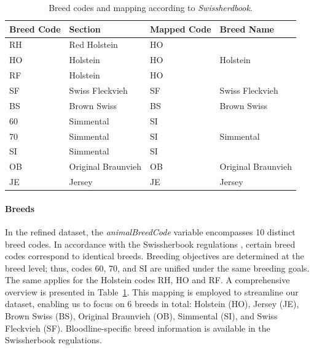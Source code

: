 \begin{table}[H]
\centering
\begin{tabular}{l l l l }
\textbf{Breed Code} & \textbf{Section} & \textbf{Mapped Code} & \textbf{Breed Name} \\
\hline
\hline
\cellcolor[HTML]{CDCDE7} RH & \cellcolor[HTML]{CDCDE7}Red Holstein & \cellcolor[HTML]{CDCDE7}HO & \cellcolor[HTML]{CDCDE7}\\
\cellcolor[HTML]{CDCDE7} HO & \cellcolor[HTML]{CDCDE7}Holstein & \cellcolor[HTML]{CDCDE7}HO & \cellcolor[HTML]{CDCDE7}Holstein \\
\cellcolor[HTML]{CDCDE7} RF & \cellcolor[HTML]{CDCDE7}Holstein & \cellcolor[HTML]{CDCDE7}HO & \cellcolor[HTML]{CDCDE7} \\
\hline
\cellcolor[HTML]{FFCCFF} SF & \cellcolor[HTML]{FFCCFF}Swiss Fleckvieh & \cellcolor[HTML]{FFCCFF}SF & \cellcolor[HTML]{FFCCFF}Swiss Fleckvieh \\
\hline
\cellcolor[HTML]{CCE5E5} BS & \cellcolor[HTML]{CCE5E5}Brown Swiss & \cellcolor[HTML]{CCE5E5}BS & \cellcolor[HTML]{CCE5E5}Brown Swiss \\
\hline
\cellcolor[HTML]{F1F1F1} 60 & \cellcolor[HTML]{F1F1F1}Simmental & \cellcolor[HTML]{F1F1F1}SI & \cellcolor[HTML]{F1F1F1}\\
\cellcolor[HTML]{F1F1F1} 70 & \cellcolor[HTML]{F1F1F1}Simmental & \cellcolor[HTML]{F1F1F1}SI & \cellcolor[HTML]{F1F1F1}Simmental\\
\cellcolor[HTML]{F1F1F1} SI & \cellcolor[HTML]{F1F1F1}Simmental & \cellcolor[HTML]{F1F1F1}SI & \cellcolor[HTML]{F1F1F1} \\
\hline
\cellcolor[HTML]{E2CDCD} OB & \cellcolor[HTML]{E2CDCD}Original Braunvieh & \cellcolor[HTML]{E2CDCD}OB & \cellcolor[HTML]{E2CDCD}Original Braunvieh \\
\hline
\cellcolor[HTML]{D0E6D0} JE & \cellcolor[HTML]{D0E6D0}Jersey & \cellcolor[HTML]{D0E6D0}JE & \cellcolor[HTML]{D0E6D0}Jersey \\
\hline
\end{tabular}
\caption{Breed codes and mapping according to \textit{Swissherdbook}.}
\label{table:breed_codes}
\end{table}


\paragraph{Breeds}
In the refined dataset, the \textit{animalBreedCode} variable encompasses 10 distinct breed codes. In accordance with the Swissherbook regulations \citep{swissherdbookregulations2022}, certain breed codes correspond to identical breeds. Breeding objectives are determined at the breed level; thus, codes 60, 70, and SI are unified under the same breeding goals. The same applies for the Holstein codes RH, HO and RF. A comprehensive overview is presented in Table~\ref{table:breed_codes}. This mapping is employed to streamline our dataset, enabling us to focus on 6 breeds in total: Holstein (HO), Jersey (JE), Brown Swiss (BS), Original Braunvieh (OB), Simmental (SI), and Swiss Fleckvieh (SF). Bloodline-specific breed information is available in the Swissherbook regulations. 

